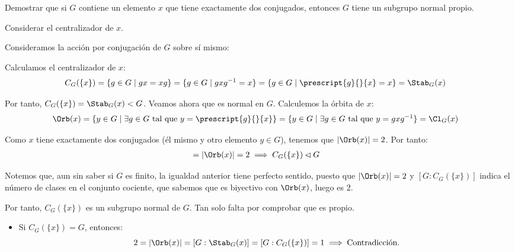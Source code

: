 \begin{ejercicio}\label{ej:6.4}
    Demostrar que si $G$ contiene un elemento $x$ que tiene exactamente dos conjugados, entonces $G$ tiene un subgrupo normal propio.
    \begin{observacion}
        Considerar el centralizador de $x$.
    \end{observacion}

    Consideramos la acción por conjugación de $G$ sobre sí mismo:

    Calculamos el centralizador de $x$:
    \begin{align*}
        C_G(\{x\}) &= \{g \in G \mid gx = xg\} = \{g \in G \mid gxg^{-1} = x\} = \{g \in G \mid \prescript{g}{}{x} = x\} = \Stab_G(x)
    \end{align*}

    Por tanto, $C_G(\{x\}) = \Stab_G(x)<G$. Veamos ahora que es normal en $G$. Calculemos la órbita de $x$:
    \begin{align*}
        \Orb(x) &= \{y\in G \mid \exists g \in G \text{ tal que } y = \prescript{g}{}{x}\} = \{y\in G \mid \exists g \in G \text{ tal que } y = gxg^{-1}\}
        = \Cl_G(x)
    \end{align*}

    Como $x$ tiene exactamente dos conjugados (él mismo y otro elemento $y\in G$), tenemos que $|\Orb(x)| = 2$. Por tanto:
    \begin{align*}
        [G:C_G(\{x\})] &= |\Orb(x)| = 2 \implies C_G(\{x\})\lhd G
    \end{align*}
    \begin{observacion}
        Notemos que, aun sin saber si $G$ es finito, la igualdad anterior tiene perfecto sentido, puesto que $|\Orb(x)|=2$ y $[G:C_G(\{x\})]$ indica el número de clases en el conjunto cociente, que sabemos que es biyectivo con $\Orb(x)$, luego es $2$.
    \end{observacion}

    Por tanto, $C_G(\{x\})$ es un subgrupo normal de $G$. Tan solo falta por comprobar que es propio.
    \begin{itemize}
        \item Si $C_G(\{x\}) = G$, entonces:
        \begin{equation*}
            2 = |\Orb(x)| = [G:\Stab_G(x)] = [G:C_G(\{x\})] = 1 \implies \text{Contradicción.}
        \end{equation*}


\end{itemize}
\end{ejercicio}

